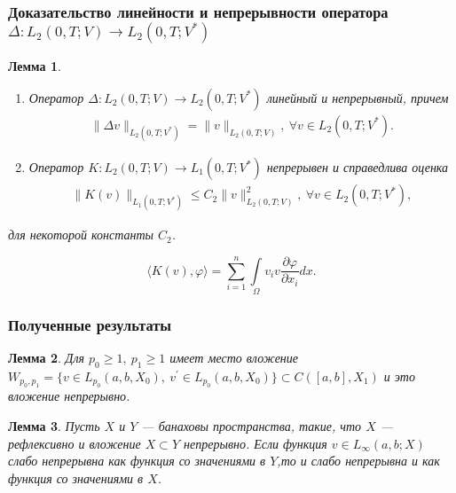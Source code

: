 \documentclass[10pt, pdf, hyperref={unicode}]{beamer}
\newtheorem{ru_lemma}{Лемма}
\renewenvironment{lemma}{\begin{ru_lemma}}{\end{ru_lemma}}
\begin{document}
  \begin{frame}
    \frametitle{Доказательство линейности и непрерывности оператора $\Delta:L_2 (0,T;V)\rightarrow L_2 (0,T;V^*)$}
    \begin{center}
      \begin{minipage}[h]{0.97\linewidth}
      \begin{lemma} ~\\
    \begin{enumerate}
        \item Оператор $\Delta: L_2(0, T; V) \rightarrow L_2(0, T; V^\ast)$ линейный и\linebreak
        непрерывный, причем
        \begin{equation}\label{eq:5.9}
            \begin{gathered}
                \| \Delta v \|_{L_2(0, T; V^\ast)} = \| v \|_{L_2(0, T; V)}, \ \forall v \in L_2(0, T; V^\ast).
            \end{gathered}
        \end{equation}
        \item Оператор $K: L_2(0, T; V) \rightarrow L_1(0, T; V^\ast)$ непрерывен и справедлива оценка
        \begin{equation}\label{eq:5.10}
            \begin{gathered}
                \| K(v) \|_{L_1(0, T; V^\ast)} \leqslant C_2\| v \|^2_{L_2(0, T;V)}, \ \forall v \in L_2(0, T; V^\ast),
            \end{gathered}
        \end{equation}
    \end{enumerate}
    для некоторой константы $C_2$.
\end{lemma}
$$\langle K(v),\varphi \rangle = \sum_{i=1}^{n}\int\limits_\Omega v_i v \frac{\partial \varphi}{\partial x_i}dx.$$
      \end{minipage}
    \end{center}
  \end{frame}


\begin{frame}
    \frametitle{Полученные результаты}
    \begin{center}
      \begin{minipage}[h]{0.97\linewidth}
        \begin{lemma}
          Для $p_0\ge 1, \ p_1\ge 1$ имеет место вложение\linebreak
          $W_{p_0,p_1}=\{v\in L_{p_0}(a,b,X_0), \ v^{\prime}\in L_{p_0}(a,b,X_0)\}\subset C([a,b],X_1)$
          и это вложение непрерывно.
        \end{lemma}
        \begin{lemma}
          Пусть $X$ и $Y$ --- банаховы пространства, такие, что $X$ --- рефлексивно и вложение $X\subset Y$ непрерывно.
          Если функция $v\in L_{\infty}(a,b;X)$ слабо непрерывна как функция со значениями в $Y$,то и слабо непрерывна и как функция со значениями в $X$.
        \end{lemma}
      \end{minipage}
    \end{center}
  \end{frame}
\end{document}
